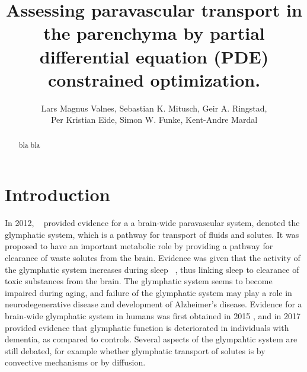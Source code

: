 \documentclass[11pt,a4paper]{article}
\title{Assessing paravascular transport in the parenchyma by partial differential equation (PDE) constrained optimization.}
\author{Lars Magnus Valnes, Sebastian K. Mitusch, Geir A. Ringstad, \\ 
Per Kristian Eide, Simon W. Funke, Kent-Andre Mardal }
\begin{document}
\maketitle

\begin{abstract}
bla bla 
\end{abstract}
\section{Introduction}
In 2012, ~\citet{iliff2012paravascular} provided evidence for a a brain-wide paravascular system, denoted the glymphatic system, which is a pathway for transport of fluids and solutes. It was proposed to have an important metabolic role by providing a pathway for clearance of waste solutes from the brain. Evidence was given that the activity of the glymphatic system increases during sleep ~\citet{xie2013sleep}, thus linking sleep to clearance of toxic substances from the brain. The glymphatic system seems to become impaired during aging, and failure of the glymphatic system may play a role in neurodegenerative disease and development of Alzheimer's disease. Evidence for a brain-wide glymphatic system in humans was first obtained in 2015 \citet{eide2015mri}, and in 2017 \citet{ringstad2018brain} provided evidence that glymphatic function is deteriorated in individuals with dementia, as compared to controls.
Several aspects of the glympahtic system are still debated, for example whether glymphatic transport of solutes is by convective mechanisms or by diffusion.

\end{document}

